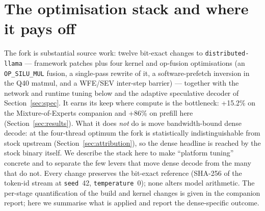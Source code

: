 \documentclass[10pt,a4paper]{article}
\begin{document}
\section{The optimisation stack and where it pays off}
\label{sec:stack}
The fork is substantial source work: twelve bit-exact changes to \texttt{distributed-llama} --- framework patches plus four kernel and op-fusion optimisations (an \texttt{OP\_SILU\_MUL} fusion, a single-pass rewrite of it, a software-prefetch inversion in the Q40 matmul, and a WFE/SEV inter-step barrier) --- together with the network and runtime tuning below and the adaptive speculative decoder of Section~\ref{sec:spec}. It earns its keep where compute is the bottleneck: +15.2\% on the Mixture-of-Experts companion and +86\% on prefill here (Section~\ref{sec:results}). What it does \emph{not} do is move bandwidth-bound dense decode: at the four-thread optimum the fork is statistically indistinguishable from stock upstream (Section~\ref{sec:attribution}), so the dense headline is reached by the stock binary itself. We describe the stack here to make ``platform tuning'' concrete and to separate the few levers that move dense decode from the many that do not. Every change preserves the bit-exact reference (SHA-256 of the token-id stream at \texttt{seed}~42, \texttt{temperature}~0); none alters model arithmetic. The per-stage quantification of the build and kernel changes is given in the companion report; here we summarise what is applied and report the dense-specific outcome.
\end{document}
